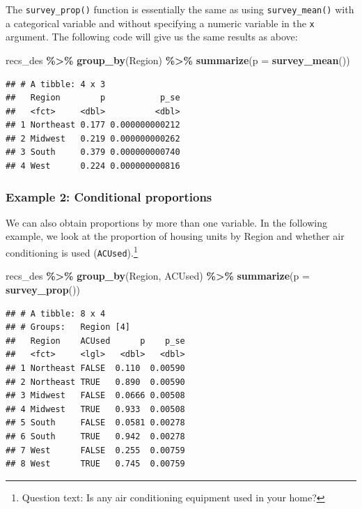 \documentclass[
]{krantz}
\makeatletter
\newenvironment{Shaded}{\begin{snugshade}}{\end{snugshade}}
\newcommand{\AttributeTok}[1]{\textcolor[rgb]{0.27,0.27,0.27}{#1}}
\newcommand{\FunctionTok}[1]{\textcolor[rgb]{0.27,0.27,0.27}{\textbf{#1}}}
\newcommand{\NormalTok}[1]{#1}
\newcommand{\SpecialCharTok}[1]{\textcolor[rgb]{0.43,0.43,0.43}{\textbf{#1}}}
\newenvironment{kframe}{%
\medskip{}
\setlength{\fboxsep}{.8em}
 \def\at@end@of@kframe{}%
 \ifinner\ifhmode%
  \def\at@end@of@kframe{\end{minipage}}%
  \begin{minipage}{\columnwidth}%
 \fi\fi%
 \def\FrameCommand##1{\hskip\@totalleftmargin \hskip-\fboxsep
 \colorbox{shadecolor}{##1}\hskip-\fboxsep
     \hskip-\linewidth \hskip-\@totalleftmargin \hskip\columnwidth}%
 \MakeFramed {\advance\hsize-\width
   \@totalleftmargin\z@ \linewidth\hsize
   \@setminipage}}%
 {\par\unskip\endMakeFramed%
 \at@end@of@kframe}
\renewenvironment{Shaded}{\begin{kframe}}{\end{kframe}}
\makeatother
\begin{document}
The \texttt{survey\_prop()} function is essentially the same as using \texttt{survey\_mean()} with a categorical variable and without specifying a numeric variable in the \texttt{x} argument. The following code will give us the same results as above:

\begin{Shaded}
\begin{Highlighting}[]
\NormalTok{recs\_des }\SpecialCharTok{\%\textgreater{}\%}
  \FunctionTok{group\_by}\NormalTok{(Region) }\SpecialCharTok{\%\textgreater{}\%}
  \FunctionTok{summarize}\NormalTok{(}\AttributeTok{p =} \FunctionTok{survey\_mean}\NormalTok{())}
\end{Highlighting}
\end{Shaded}

\begin{verbatim}
## # A tibble: 4 x 3
##   Region        p           p_se
##   <fct>     <dbl>          <dbl>
## 1 Northeast 0.177 0.000000000212
## 2 Midwest   0.219 0.000000000262
## 3 South     0.379 0.000000000740
## 4 West      0.224 0.000000000816
\end{verbatim}

\hypertarget{example-2-conditional-proportions}{%
\subsubsection*{Example 2: Conditional proportions}\label{example-2-conditional-proportions}}


We can also obtain proportions by more than one variable. In the following example, we look at the proportion of housing units by Region and whether air conditioning is used (\texttt{ACUsed}).\footnote{Question text: Is any air conditioning equipment used in your home?}

\begin{Shaded}
\begin{Highlighting}[]
\NormalTok{recs\_des }\SpecialCharTok{\%\textgreater{}\%}
  \FunctionTok{group\_by}\NormalTok{(Region, ACUsed) }\SpecialCharTok{\%\textgreater{}\%}
  \FunctionTok{summarize}\NormalTok{(}\AttributeTok{p =} \FunctionTok{survey\_prop}\NormalTok{())}
\end{Highlighting}
\end{Shaded}

\begin{verbatim}
## # A tibble: 8 x 4
## # Groups:   Region [4]
##   Region    ACUsed      p    p_se
##   <fct>     <lgl>   <dbl>   <dbl>
## 1 Northeast FALSE  0.110  0.00590
## 2 Northeast TRUE   0.890  0.00590
## 3 Midwest   FALSE  0.0666 0.00508
## 4 Midwest   TRUE   0.933  0.00508
## 5 South     FALSE  0.0581 0.00278
## 6 South     TRUE   0.942  0.00278
## 7 West      FALSE  0.255  0.00759
## 8 West      TRUE   0.745  0.00759
\end{verbatim}
\end{document}
